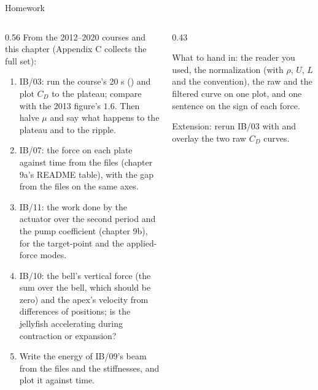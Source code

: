 \documentclass[aspectratio=169,11pt]{beamer}
\begin{document}
\begin{frame}{Homework}
\label{fr:hw}
\begin{columns}[T,onlytextwidth]
\begin{column}{0.56\textwidth}
\footnotesize From the 2012--2020 courses and this chapter (Appendix C collects the full set):
\begin{enumerate}
  \item IB/03: run the course's 20 s () and plot $C_D$ to the plateau; compare with the 2013 figure's $1.6$. Then halve $\mu$ and say what happens to the plateau and to the ripple.
  \item IB/07: the force on each plate against time from the  files (chapter 9a's README table), with the gap from the  files on the same axes.
  \item IB/11: the work done by the actuator over the second period and the pump coefficient (chapter 9b), for the target-point and the applied-force modes.
  \item IB/10: the bell's vertical force (the sum over the bell, which should be zero) and the apex's velocity from differences of positions; is the jellyfish accelerating during contraction or expansion?
  \item Write the energy of IB/09's beam from the  files and the stiffnesses, and plot it against time.
\end{enumerate}
\end{column}
\begin{column}{0.43\textwidth}
\begin{punchbox}
\scriptsize What to hand in: the reader you used, the normalization (with $\rho$, $U$, $L$ and the convention), the raw and the filtered curve on one plot, and one sentence on the sign of each force.
\end{punchbox}
\scriptsize Extension: rerun IB/03 with  and overlay the two raw $C_D$ curves.
\end{column}
\end{columns}
\end{frame}
\end{document}
